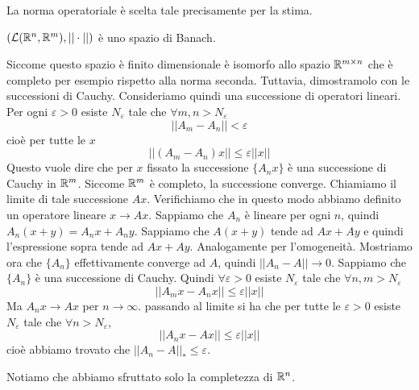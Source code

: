 \documentclass[a4paper]{article}
\begin{document}
La norma operatoriale è scelta tale precisamente per la stima.

\begin{snippettheorem}{}
    \((\mathcal{L}(\mathbb{R}^n, \mathbb{R}^m), ||\cdot||)\) è uno spazio di Banach.
\end{snippettheorem}

\begin{snippetproof}{}
    Siccome questo spazio è finito dimensionale è isomorfo allo spazio \(\mathbb{R}^{m \times n}\)
    che è completo per esempio rispetto alla norma seconda.
    Tuttavia, dimostramolo con le successioni di Cauchy. Consideriamo quindi una successione di operatori lineari.
    Per ogni \(\varepsilon > 0\) esiste \(N_\varepsilon\) tale che \(\forall m,n > N_\varepsilon\)
    \[
        ||A_m - A_n|| < \varepsilon
    \]
    cioè per tutte le \(x\)
    \[
        ||(A_m - A_n)x|| \leq \varepsilon||x||
    \]
    Questo vuole dire che per \(x\) fissato la successione \(\{A_n x\}\) è una successione di Cauchy
    in \(\mathbb{R}^m\). Siccome \(\mathbb{R}^m\) è completo, la successione converge.
    Chiamiamo il limite di tale successione \(Ax\).
    Verifichiamo che in questo modo abbiamo definito un operatore lineare \(x \to Ax\).
    Sappiamo che \(A_n\) è lineare per ogni \(n\), quindi \(A_n(x + y) = A_nx + A_n y\).
    Sappiamo che \(A(x+y)\) tende ad \(Ax + Ay\) e quindi
    l'espressione sopra tende ad \(Ax + Ay\).
    Analogamente per l'omogeneità.
    Mostriamo ora che \(\{A_n\}\) effettivamente converge ad \(A\), quindi \(||A_n - A|| \to 0\).
    Sappiamo che \(\{A_n\}\) è una successione di Cauchy.
    Quindi \(\forall \varepsilon > 0\) esiste \(N_\varepsilon\) tale che \(\forall n,m > N_\varepsilon\)
    \[
        ||A_m x - A_n x|| \leq \varepsilon||x||
    \]
    Ma \(A_n x \to A x\) per \(n \to \infty\).
    passando al limite si ha che per tutte le \(\varepsilon > 0\) esiste \(N_\varepsilon\)
    tale che \(\forall n > N_\varepsilon\), \[
        ||A_nx - Ax|| \leq \varepsilon||x||
    \]
    cioè abbiamo trovato che \(||A_n - A||_* \leq \varepsilon\).
\end{snippetproof}

Notiamo che abbiamo sfruttato solo la completezza di \(\mathbb{R}^n\).
\end{document}
